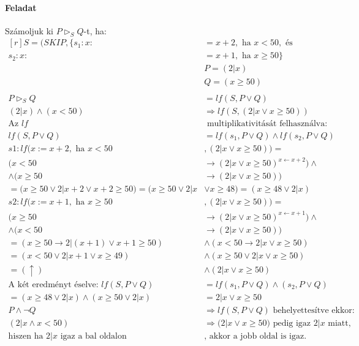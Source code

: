 \documentclass[12pt]{article}
\newcommand{\haromszog}[2]{$#1 \vartriangleright_S #2$}
\begin{document}
\paragraph{Feladat}
\par Számoljuk ki \haromszog{P}{Q}-t, ha:\\
$
\begin{aligned}[r]
S = (SKIP, \{s_1: x :&= x+2, \text{ ha } x<50, \text{ és}\\
s_2: x :&= x+1, \text{ ha } x\ge 50 \}\\
&P = (2|x)\\
&Q = (x\ge50)\\
 \\
P \vartriangleright_S Q &= lf(S, P \lor Q)\\
(2|x)\land (x<50) &\Rightarrow lf(S, (2|x \lor x\ge50)) \\
\text{Az } lf &\text{ multiplikativitását felhasználva:}\\
lf(S,P \lor Q) &= lf(s_1, P\lor Q) \land lf(s_2, P\lor Q)\\
s1: lf(x:=x+2, \text { ha } x<50 &, (2|x \lor x\ge50) ) = \\
(x<50 &\rightarrow (2|x \lor x\ge50)^{x \leftarrow x+2}) \land \\
\land (x\ge50 &\rightarrow (2|x \lor x\ge50))\\
=(x\ge50 \lor 2|x+2 \lor x+2\ge50) = (x\ge50 \lor 2|x &\lor x\ge48)= (x\ge48 \lor 2|x)\\
s2: lf(x:=x+1, \text { ha } x\ge50 &, (2|x \lor x\ge50) ) = \\
(x\ge50 &\rightarrow (2|x \lor x\ge50)^{x \leftarrow x+1}) \land \\
\land (x<50 &\rightarrow (2|x \lor x\ge50))\\
=(x\ge50 \rightarrow 2|(x+1) \lor x+1\ge50) &\land (x<50 \rightarrow 2|x \lor x\ge50)\\
=(x<50 \lor 2|x+1 \lor x\ge49) &\land (x\ge50 \lor 2|x \lor x\ge50)\\
=(\uparrow) &\land (2|x \lor x\ge50)\\
\text{A két eredményt éselve: } lf(S,P\lor Q) &= lf(s_1,P\lor Q) \land (s_2, P \lor Q)\\
=(x\ge48 \lor 2|x) \land (x\ge50 \lor 2|x) &= 2|x \lor x\ge50\\
P\land \neg Q &\Rightarrow lf(S,P\lor Q) \text{ behelyettesítve ekkor:}\\
(2|x \land x<50) &\Rightarrow (2|x \lor x\ge50) \text{ pedig igaz }2|x\text{ miatt,}\\
\text{hiszen ha }2|x \text{ igaz a bal oldalon}&, \text{ akkor a jobb oldal is igaz.}
\end{aligned}
$
\end{document}
